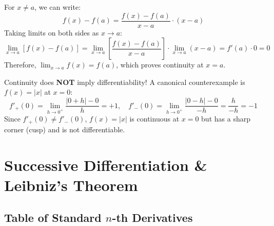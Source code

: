 \begin{solutionbox}
For $x \ne a$, we can write:
\begin{equation*}
    f(x) - f(a) = \frac{f(x) - f(a)}{x - a} \cdot (x - a)
\end{equation*}
Taking limits on both sides as $x \to a$:
\begin{equation*}
    \lim_{x\to a} [f(x) - f(a)] = \lim_{x\to a} \left[\frac{f(x) - f(a)}{x - a}\right] \cdot \lim_{x\to a}(x - a) = f'(a) \cdot 0 = 0
\end{equation*}
Therefore, $\lim_{x\to a} f(x) = f(a)$, which proves continuity at $x = a$.
\end{solutionbox}

\begin{commonmistake}
Continuity does \textbf{NOT} imply differentiability! A canonical counterexample is $f(x) = |x|$ at $x=0$:
\begin{equation*}
    f'_+(0) = \lim_{h\to 0^+} \frac{|0+h| - 0}{h} = +1, \quad f'_-(0) = \lim_{h\to 0^+} \frac{|0-h| - 0}{-h} = \frac{h}{-h} = -1
\end{equation*}
Since $f'_+(0) \ne f'_-(0)$, $f(x)=|x|$ is continuous at $x=0$ but has a sharp corner (cusp) and is not differentiable.
\end{commonmistake}

\section{Successive Differentiation \& Leibniz's Theorem}

\subsection{Table of Standard $n$-th Derivatives}

